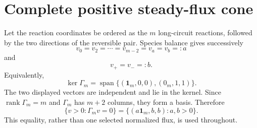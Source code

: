 \section*{Complete positive steady-flux cone}
Let the reaction coordinates be ordered as the $m$ long-circuit reactions,
followed by the two directions of the reversible pair.  Species balance gives
successively
\[
v_0=v_2=\cdots=v_{m-2}=v_a=v_b=:a
\]
and
\[
v_+=v_-=:b.
\]
Equivalently,
\[
\ker\Gamma_m=\operatorname{span}\{(\mathbf1_m,0,0),(0_m,1,1)\}.
\]
The two displayed vectors are independent and lie in the kernel.  Since
$\operatorname{rank}\Gamma_m=m$ and $\Gamma_m$ has $m+2$ columns, they form a
basis.  Therefore
\[
\{v>0:\Gamma_mv=0\}=\{(a\mathbf1_m,b,b):a,b>0\}.
\]
This equality, rather than one selected normalized flux, is used throughout.
